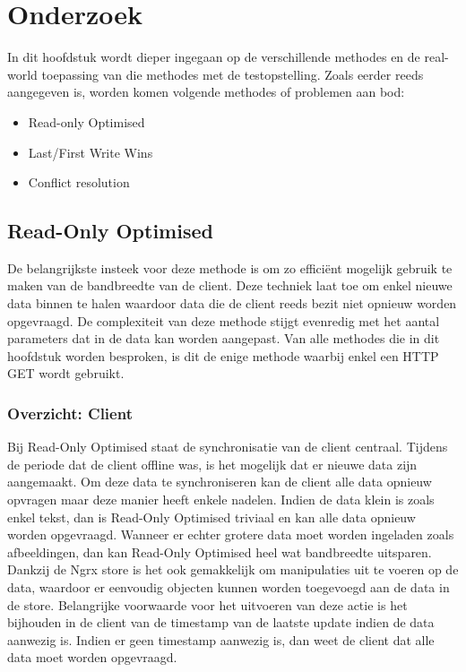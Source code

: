 
\chapter{Onderzoek}
\label{ch:onderzoek}

In dit hoofdstuk wordt dieper ingegaan op de verschillende methodes  en de real-world toepassing van die methodes met de testopstelling. Zoals eerder reeds aangegeven is, worden komen volgende methodes of problemen aan bod:
\begin{itemize}
\item Read-only Optimised
\item Last/First Write Wins
\item Conflict resolution
\end{itemize}

\section{Read-Only Optimised}
De belangrijkste insteek voor deze methode is om zo effici\"ent mogelijk gebruik te maken van de bandbreedte van de client. Deze techniek laat toe om enkel nieuwe data binnen te halen waardoor data die de client reeds bezit niet opnieuw worden opgevraagd. De complexiteit van deze methode stijgt evenredig met het aantal parameters dat in de data kan worden aangepast. Van alle methodes die in dit hoofdstuk worden besproken, is dit de enige methode waarbij enkel een HTTP GET wordt gebruikt.
\subsection{Overzicht: Client}
Bij Read-Only Optimised staat de synchronisatie van de client centraal. Tijdens de periode dat de client offline was, is het mogelijk dat er nieuwe data zijn aangemaakt. Om deze data te synchroniseren kan de client alle data opnieuw opvragen maar deze manier heeft enkele nadelen. Indien de data klein is zoals enkel tekst, dan is Read-Only Optimised triviaal en kan alle data opnieuw worden opgevraagd. Wanneer er echter grotere data moet worden ingeladen zoals afbeeldingen, dan kan Read-Only Optimised heel wat bandbreedte uitsparen. Dankzij de Ngrx store is het ook gemakkelijk om manipulaties uit te voeren op de data, waardoor er eenvoudig objecten kunnen worden toegevoegd aan de data in de store. Belangrijke voorwaarde voor het uitvoeren van deze actie is het bijhouden in de client van de timestamp van de laatste update indien de data aanwezig is. Indien er geen timestamp aanwezig is, dan weet de client dat alle data moet worden opgevraagd.

